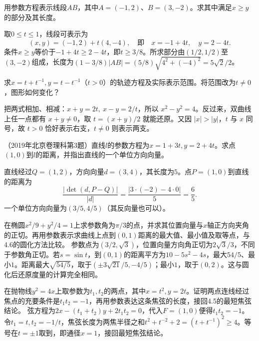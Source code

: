 用参数方程表示线段\(AB\)，其中\(A=(-1,2)\)、\(B=(3,-2)\)。求其中满足\(x\ge y\)的部分及其长度。
\par
\solutionanswer
取\(0\le t\le1\)，线段可表示为
\[
(x,y)=(-1,2)+t(4,-4),
\quad\text{即}\quad x=-1+4t,\quad y=2-4t.
\]
条件\(x\ge y\)等价于\(-1+4t\ge2-4t\)，即\(t\ge3/8\)。所求部分由\((1/2,1/2)\)至\((3,-2)\)组成，长度为\((1-3/8)|AB|=(5/8)\sqrt{4^2+(-4)^2}=5\sqrt2/2\)。


求\(x=t+t^{-1},y=t-t^{-1}\)（\(t>0\)）的轨迹方程及实际表示范围。将范围改为\(t\ne0\)，图形如何变化？
\par
\solutionanswer
把两式相加、相减：\(x+y=2t,\ x-y=2/t\)，所以 \(x^2-y^2=4\)。反过来，双曲线上任一点都有 \(x+y\ne0\)，取 \(t=(x+y)/2\) 就能还原。又因 \(|x|>|y|\)，\(t\) 与 \(x\) 同号，故 \(t>0\) 恰好表示右支，\(t\ne0\) 则表示两支。


（2019年北京卷理科第3题）直线\(l\)的参数方程为\(x=1+3t,y=2+4t\)。求点\((1,0)\)到\(l\)的距离，并指出直线的一个单位方向向量。
\par
\solutionanswer
直线经过\(Q=(1,2)\)，方向向量\(d=(3,4)\)，其长度为\(5\)。点\(P=(1,0)\)到直线的距离为
\[
\frac{|\det(d,P-Q)|}{|d|}
=\frac{|3\cdot(-2)-4\cdot0|}{5}=\frac65.
\]
一个单位方向向量为\((3/5,4/5)\)（其反向量也可以）。


在椭圆\(x^2/9+y^2/4=1\)上求参数角为\(\pi/3\)的点，并求其位置向量与\(x\)轴正方向夹角的正切。再用参数表示求曲线上点到\((0,1)\)距离的最大值、最小值及取等点，与4.6的圆化方法比较。
\solutionanswer
参数点为\((3/2,\sqrt3)\)，位置向量方向角正切为\(2\sqrt3/3\)，不同于参数角正切。若\(s=\sin t\)，到\((0,1)\)的距离平方为\(10-5s^2-4s\)，最大\(54/5\)、最小\(1\)。距离最大\(\sqrt{54/5}\)，取于\((\pm3\sqrt{21}/5,-4/5)\)；最小\(1\)，取于\((0,2)\)。这与圆化后还原度量的计算完全相同。


在抛物线\(y^2=4x\)上取参数为\(t_1,t_2\)的两点，其中\(x=t^2,y=2t\)。证明两点连线经过焦点的充要条件是\(t_1t_2=-1\)，再用参数表达这条焦弦的长度，接回4.5的最短焦弦结论。
\solutionanswer
弦方程为\(2x-(t_1+t_2)y+2t_1t_2=0\)，代入\(F=(1,0)\)便得\(t_1t_2=-1\)。令\(t_1=t,t_2=-1/t\)，焦弦长度为两焦半径之和\(t^2+t^{-2}+2=(t+t^{-1})^2\ge4\)。等号在\(t=\pm1\)取到，即通径\(x=1\)，接回最短焦弦结论。


